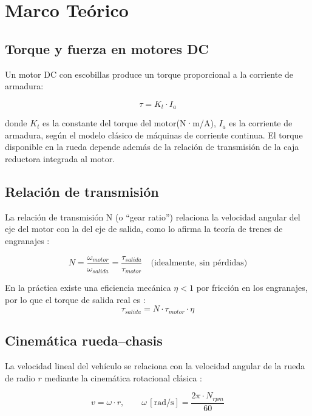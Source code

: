 \documentclass[journal]{IEEEtran}
\begin{document}
\section{Marco Teórico}
\subsection{Torque y fuerza en motores DC}

Un motor DC con escobillas produce un torque proporcional a la corriente de armadura:

\begin{equation}
\tau = K_t \cdot I_a
\end{equation}

donde $K_t$ es la constante del torque del motor(N·m/A), $I_a$ es la corriente de armadura, según el modelo clásico de máquinas de corriente continua. \cite{chapman} El torque disponible en la rueda depende además de la relación de transmisión de la caja reductora integrada al motor.


\subsection{Relación de transmisión}
La relación de transmisión N (o ``gear ratio'') relaciona la velocidad angular del eje del motor con la del eje de salida, como lo afirma la teoría de trenes de engranajes \cite{norton}:  

\begin{equation}
N = \frac{\omega_{motor}}{\omega_{salida}} = \frac{\tau_{salida}}{\tau_{motor}} \quad \text{(idealmente, sin pérdidas)}
\end{equation}

En la práctica existe una eficiencia mecánica $\eta<1$ por fricción en los engranajes, por lo que el torque de salida real es \cite{norton}:
\begin{equation}
\tau_{salida} = N \cdot \tau_{motor} \cdot \eta
\end{equation}

\subsection{Cinemática rueda--chasis}
La velocidad lineal del vehículo se relaciona con la velocidad angular de la rueda de radio $r$ mediante la cinemática rotacional clásica \cite{norton}:

\begin{equation}
v = \omega \cdot r, \qquad \omega \, [\text{rad/s}] = \frac{2\pi \cdot N_{rpm}}{60}
\end{equation}
\end{document}
